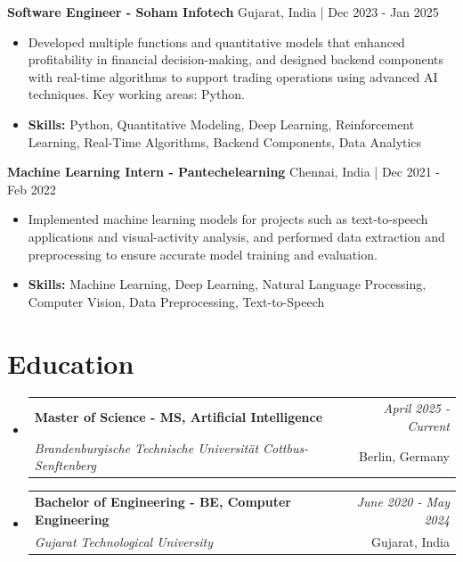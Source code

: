 \documentclass[a4paper,11pt]{article}
\makeatletter
\newcommand{\resumeSubheading}[4]{
\vspace{0.5mm}\item
    \begin{tabular*}{0.98\textwidth}[t]{l@{\extracolsep{\fill}}r}
        \textbf{#1} & \textit{\footnotesize{#4}} \\
        \textit{\footnotesize{#3}} &  \footnotesize{#2}\\
    \end{tabular*}
    \vspace{-2.4mm}
}
\makeatother
\begin{document}
\vspace{1mm}
  \textbf{Software Engineer - Soham Infotech} \hfill Gujarat, India | Dec 2023 - Jan 2025
\vspace{-1.5mm} %
\begin{itemize}
  \item Developed multiple functions and quantitative models that enhanced profitability in financial decision-making, and designed backend components with real-time algorithms to support trading operations using advanced AI techniques. Key working areas: Python.

\vspace{-2mm}
  \item \textbf{Skills:} Python, Quantitative Modeling, Deep Learning, Reinforcement Learning, Real-Time Algorithms, Backend Components, Data Analytics
\end{itemize}

\vspace{1mm}
  \textbf{Machine Learning Intern - Pantechelearning} \hfill Chennai, India | Dec 2021 - Feb 2022
\vspace{-1.5mm} %
\begin{itemize}
  \item Implemented machine learning models for projects such as text-to-speech applications and visual-activity analysis, and performed data extraction and preprocessing to ensure accurate model training and evaluation.
\vspace{-2mm}
  \item \textbf{Skills:} Machine Learning, Deep Learning, Natural Language Processing, Computer Vision, Data Preprocessing, Text-to-Speech
\end{itemize}\section{\textbf{Education}}
\vspace{-0.4mm}

\begin{itemize}
\resumeSubheading
{Master of Science - MS, Artificial Intelligence }{Berlin, Germany}
{Brandenburgische Technische Universität Cottbus-Senftenberg  }{April 2025 - Current}

\vspace{1.0mm} %
\resumeSubheading
{Bachelor of Engineering - BE, Computer Engineering  }{Gujarat, India}
{Gujarat Technological University }{June 2020 - May 2024}

\end{itemize}
\end{document}
